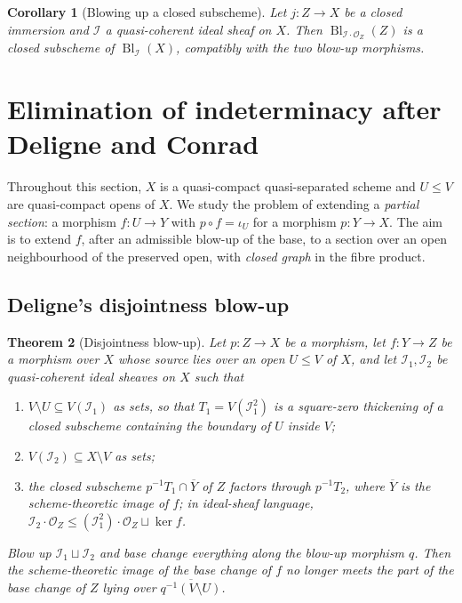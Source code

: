\documentclass[11pt,a4paper]{article}
\theoremstyle{plain}
\newtheorem{theorem}{Theorem}[section]
\newtheorem{corollary}[theorem]{Corollary}
\theoremstyle{definition}
\theoremstyle{remark}
\newcommand{\Bl}{\operatorname{Bl}}
\newcommand{\sO}{\mathcal{O}}
\newcommand{\sI}{\mathcal{I}}
\newcommand{\qcqs}{quasi-compact quasi-separated}
\begin{document}
\begin{corollary}[Blowing up a closed subscheme]
\label{cor:080E-closed}
Let $j\colon Z\to X$ be a closed immersion and $\sI$ a quasi-coherent ideal
sheaf on $X$. Then $\Bl_{\sI\cdot\sO_Z}(Z)$ is a closed subscheme of
$\Bl_\sI(X)$, compatibly with the two blow-up morphisms.
\end{corollary}

\section{Elimination of indeterminacy after Deligne and Conrad}
\label{sec:conrad}

Throughout this section, $X$ is a \qcqs{} scheme and $U\le V$ are
quasi-compact opens of $X$. We study the problem of extending a \emph{partial
section}: a morphism $f\colon U\to Y$ with $p\circ f=\iota_U$ for a morphism
$p\colon Y\to X$. The aim is to extend $f$, after an admissible blow-up of the
base, to a section over an open neighbourhood of the preserved open, with
\emph{closed graph} in the fibre product.

\subsection{Deligne's disjointness blow-up}

\begin{theorem}[Disjointness blow-up]
\label{thm:disjointness}
Let $p\colon Z\to X$ be a morphism, let $f\colon Y\to Z$ be a morphism over $X$
whose source lies over an open $U\le V$ of $X$, and let $\sI_1,\sI_2$ be
quasi-coherent ideal sheaves on $X$ such that
\begin{enumerate}[label=\textup{(\alph*)}, itemsep=1pt]
\item $V\setminus U\subseteq V(\sI_1)$ as sets, so that $T_1=V(\sI_1^{2})$ is a
      square-zero thickening of a closed subscheme containing the boundary of
      $U$ inside $V$;
\item $V(\sI_2)\subseteq X\setminus V$ as sets;
\item the closed subscheme $p^{-1}T_1\cap\overline{Y}$ of $Z$ factors through
      $p^{-1}T_2$, where $\overline{Y}$ is the scheme-theoretic image of $f$;
      in ideal-sheaf language,
      $\sI_2\cdot\sO_Z\le(\sI_1^{2})\cdot\sO_Z\sqcup\ker f$.
\end{enumerate}
Blow up $\sI_1\sqcup\sI_2$ and base change everything along the blow-up
morphism $q$. Then the scheme-theoretic image of the base change of $f$ no
longer meets the part of the base change of $Z$ lying over
$\overline{q^{-1}(V\setminus U)}$.
\end{theorem}
\end{document}
